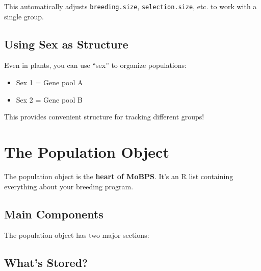 \documentclass[
  letterpaper,
]{book}
\newenvironment{Shaded}{\begin{snugshade}}{\end{snugshade}}
\newcommand{\CommentTok}[1]{\textcolor[rgb]{0.37,0.37,0.37}{#1}}
\newcommand{\FunctionTok}[1]{\textcolor[rgb]{0.28,0.35,0.67}{#1}}
\newcommand{\NormalTok}[1]{\textcolor[rgb]{0.00,0.23,0.31}{#1}}
\newcommand{\SpecialCharTok}[1]{\textcolor[rgb]{0.37,0.37,0.37}{#1}}
\providecommand{\tightlist}{%
  \setlength{\itemsep}{0pt}\setlength{\parskip}{0pt}}
\begin{document}
This automatically adjusts \texttt{breeding.size},
\texttt{selection.size}, etc. to work with a single group.

\subsection{Using Sex as Structure}\label{using-sex-as-structure}

Even in plants, you can use ``sex'' to organize populations:

\begin{itemize}
\tightlist
\item
  Sex 1 = Gene pool A
\item
  Sex 2 = Gene pool B
\end{itemize}

This provides convenient structure for tracking different groups!

\section{The Population Object}\label{sec-population-object}

The population object is the \textbf{heart of MoBPS}. It's an R list
containing everything about your breeding program.

\subsection{Main Components}\label{main-components}

The population object has two major sections:

\begin{Shaded}
\end{Shaded}

\subsection{What's Stored?}\label{whats-stored}
\end{document}
